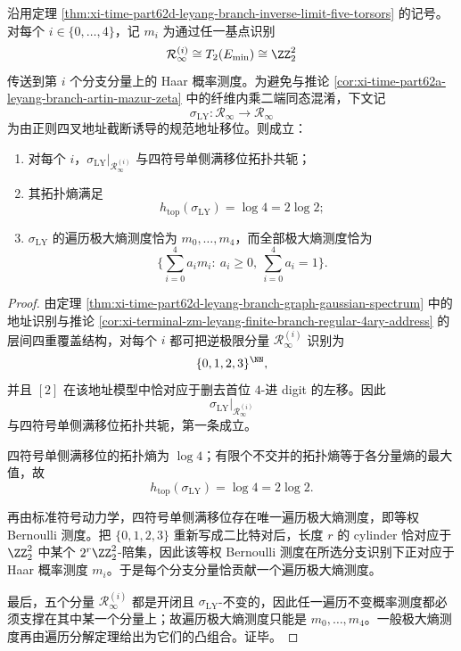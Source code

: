 \begin{theorem}\label{thm:xi-time-part62d-leyang-branch-maximal-entropy-measures}
沿用定理 \ref{thm:xi-time-part62d-leyang-branch-inverse-limit-five-torsors} 的记号。对每个 \(i\in\{0,\dots,4\}\)，记 \(m_i\) 为通过任一基点识别
\[
\mathcal R_\infty^{(i)}\cong T_2(E_{\min})\cong \ZZ_2^2
\]
传送到第 \(i\) 个分支分量上的 Haar 概率测度。为避免与推论 \ref{cor:xi-time-part62a-leyang-branch-artin-mazur-zeta} 中的纤维内乘二端同态混淆，下文记
\[
\sigma_{\mathrm{LY}}:\mathcal R_\infty\to \mathcal R_\infty
\]
为由正则四叉地址截断诱导的规范地址移位。则成立：
\begin{enumerate}
  \item 对每个 \(i\)，\(\sigma_{\mathrm{LY}}\big|_{\mathcal R_\infty^{(i)}}\) 与四符号单侧满移位拓扑共轭；
  \item 其拓扑熵满足
  \[
  h_{\mathrm{top}}(\sigma_{\mathrm{LY}})=\log 4=2\log 2;
  \]
  \item \(\sigma_{\mathrm{LY}}\) 的遍历极大熵测度恰为 \(m_0,\dots,m_4\)，而全部极大熵测度恰为
  \[
  \Biggl\{
  \sum_{i=0}^{4}a_i m_i:\ a_i\ge 0,\ \sum_{i=0}^{4}a_i=1
  \Biggr\}.
  \]
\end{enumerate}
\end{theorem}
\begin{proof}
由定理 \ref{thm:xi-time-part62d-leyang-branch-graph-gaussian-spectrum} 中的地址识别与推论 \ref{cor:xi-terminal-zm-leyang-finite-branch-regular-4ary-address} 的层间四重覆盖结构，对每个 \(i\) 都可把逆极限分量 \(\mathcal R_\infty^{(i)}\) 识别为
\[
\{0,1,2,3\}^{\NN},
\]
并且 \([2]\) 在该地址模型中恰对应于删去首位 \(4\)-进 digit 的左移。因此
\[
\sigma_{\mathrm{LY}}\big|_{\mathcal R_\infty^{(i)}}
\]
与四符号单侧满移位拓扑共轭，第一条成立。

四符号单侧满移位的拓扑熵为 \(\log 4\)；有限个不交并的拓扑熵等于各分量熵的最大值，故
\[
h_{\mathrm{top}}(\sigma_{\mathrm{LY}})=\log 4=2\log 2.
\]

再由标准符号动力学，四符号单侧满移位存在唯一遍历极大熵测度，即等权 Bernoulli 测度。把 \(\{0,1,2,3\}\) 重新写成二比特对后，长度 \(r\) 的 cylinder 恰对应于 \(\ZZ_2^2\) 中某个 \(2^r\ZZ_2^2\)-陪集，因此该等权 Bernoulli 测度在所选分支识别下正对应于 Haar 概率测度 \(m_i\)。于是每个分支分量恰贡献一个遍历极大熵测度。

最后，五个分量 \(\mathcal R_\infty^{(i)}\) 都是开闭且 \(\sigma_{\mathrm{LY}}\)-不变的，因此任一遍历不变概率测度都必须支撑在其中某一个分量上；故遍历极大熵测度只能是 \(m_0,\dots,m_4\)。一般极大熵测度再由遍历分解定理给出为它们的凸组合。证毕。
\end{proof}


